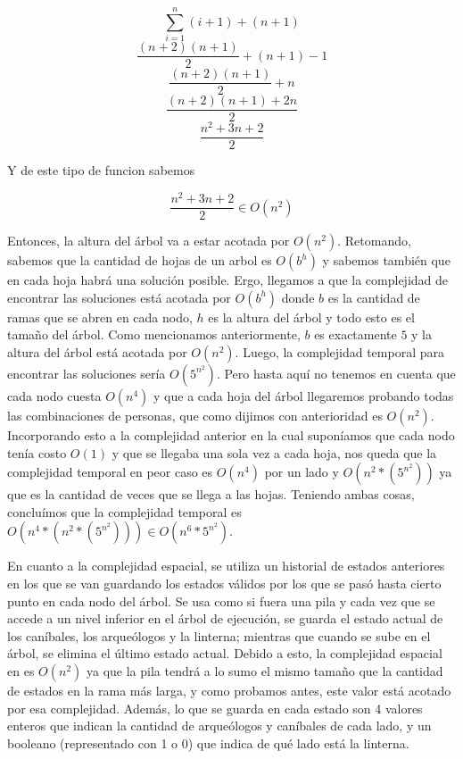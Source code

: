       \[
      \sum_{i=1}^{n}(i+1) + (n+1)
      \]
      \[
      \frac{(n+2)(n+1)}{2} + (n+1) - 1
      \]
      \[
      \frac{(n+2)(n+1)}{2} + n
      \]
      \[
      \frac{(n+2)(n+1)+2n}{2}
      \]
      \[
      \frac{n^2+3n+2}{2}
      \]

      Y de este tipo de funcion sabemos \newline

      \[
      \frac{n^2+3n+2}{2} \in O(n^2)
      \]

      Entonces, la altura del árbol va a estar acotada por $O(n^2)$.
      Retomando, sabemos que la cantidad de hojas de un arbol es $O(b^h)$ y sabemos también que en cada hoja habrá una solución posible. Ergo, llegamos a que la complejidad de encontrar las soluciones está acotada por $O(b^h)$ donde $b$ es la cantidad de ramas que se abren en cada nodo, $h$ es la altura del árbol y todo esto es el tamaño del árbol. Como mencionamos anteriormente, $b$ es exactamente $5$ y la altura del árbol está acotada por $O(n^2)$. Luego, la complejidad temporal para encontrar las soluciones sería $O(5^{n^2})$. Pero hasta aquí no tenemos en cuenta que cada nodo cuesta $O(n^4)$ y que a cada hoja del árbol llegaremos probando todas las combinaciones de personas, que como dijimos con anterioridad es $O(n^2)$. Incorporando esto a la complejidad anterior en la cual suponíamos que cada nodo tenía costo $O(1)$ y que se llegaba una sola vez a cada hoja, nos queda que la complejidad temporal en peor caso es $O(n^4)$ por un lado y $O(n^2*(5^{n^2}))$ ya que es la cantidad de veces que se llega a las hojas. Teniendo ambas cosas, concluímos que la complejidad temporal es $O(n^4 * (n^2*(5^{n^2}))) \in O(n^6 * 5^{n^2})$.

      En cuanto a la complejidad espacial, se utiliza un historial de estados anteriores en los que se van guardando los estados válidos por los que se pasó hasta cierto punto en cada nodo del árbol. Se usa como si fuera una pila y cada vez que se accede a un nivel inferior en el árbol de ejecución, se guarda el estado actual de los caníbales, los arqueólogos y la linterna; mientras que cuando se sube en el árbol, se elimina el último estado actual. Debido a esto, la complejidad espacial en es $O(n^2)$ ya que la pila tendrá a lo sumo el mismo tamaño que la cantidad de estados en la rama más larga, y como probamos antes, este valor está acotado por esa complejidad. Además, lo que se guarda en cada estado son 4 valores enteros que indican la cantidad de arqueólogos y caníbales de cada lado, y un booleano (representado con 1 o 0) que indica de qué lado está la linterna.


